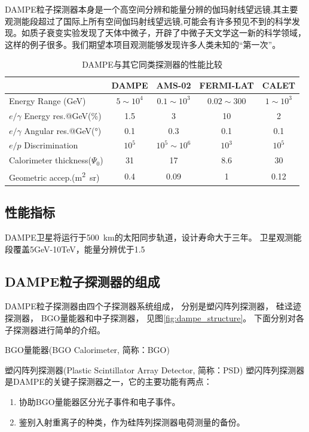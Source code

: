 DAMPE粒子探测器本身是一个高空间分辨和能量分辨的伽玛射线望远镜,其主要观测能段超过了国际上所有空间伽玛射线望远镜,可能会有许多预见不到的科学发现。如质子衰变实验发现了天体中微子，开辟了中微子天文学这一新的科学领域，这样的例子很多。我们期望本项目观测能够发现许多人类未知的“第一次”。

\begin{table}[htb]
	\centering
	\caption{DAMPE与其它同类探测器的性能比较}
	\label{tab:dampe_comparison}
	\begin{tabulary}{\linewidth}{LCCCC}
		\toprule[1.5pt]
		  & DAMPE & AMS-02 & FERMI-LAT & CALET \\ 
		\midrule[1pt]
		Energy Range (\si{GeV}) & $5\sim10^4$ & $0.1\sim10^3$ & $0.02\sim300$ & $1\sim10^3$ \\ 
		$e/\gamma$ Energy res.@\si{GeV}(\si{\percent}) & 1.5 & 3 & 10 & 2 \\ 
		$e/\gamma$ Angular res.@\si{GeV}(\si{\degree}) & 0.1 & 0.3 & 0.1 & 0.1 \\ 
		$e/p$ Discrimination& $10^5$ & $10^5\sim10^6$ & $10^3$ & $10^5$ \\ 
		Calorimeter thickness($\Psi_0$) & 31 & 17 & 8.6 & 30 \\ 
		Geometric accep.(\si{\meter\squared\steradian}) & 0.4 & 0.09 & 1 & 0.12 \\ 
		\bottomrule[1.5pt] 
	\end{tabulary} 
\end{table}

\subsection{性能指标}
DAMPE卫星将运行于\SI{500}{\kilo\meter}的太阳同步轨道，设计寿命大于三年。
卫星观测能段覆盖5GeV-10TeV，能量分辨优于1.5%
\subsection{DAMPE粒子探测器的组成}
DAMPE粒子探测器由四个子探测器系统组成， 分别是塑闪阵列探测器， 硅迳迹探测器， BGO量能器和中子探测器， 见图\ref{fig:dampe_structure}。
下面分别对各子探测器进行简单的介绍。

BGO量能器(BGO Calorimeter, 简称：BGO)

塑闪阵列探测器(Plastic Scintillator Array Detector, 简称：PSD)
塑闪阵列探测器是DAMPE的关键子探测器之一，它的主要功能有两点：
\begin{enumerate}
	\item 协助BGO量能器区分光子事件和电子事件。
	\item 鉴别入射重离子的种类，作为硅阵列探测器电荷测量的备份。
\end{enumerate}

